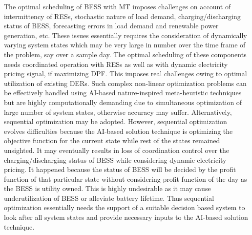 \documentclass[journal]{IEEEtran}
\begin{document}
\par The optimal scheduling of BESS with MT imposes challenges on account of intermittency of RESs, stochastic nature of load demand, charging/discharging status of BESS, forecasting errors in load demand and renewable power generation, etc. These issues essentially requires the consideration of dynamically varying system states which may be very large in number over the time frame of the problem, say over a sample day. The optimal scheduling of these components needs coordinated operation with RESs as well as with dynamic electricity pricing signal, if maximizing DPF. This imposes real challenges owing to optimal utilization of existing DERs. Such complex non-linear optimization problems can be effectively handled using AI-based nature-inspired meta-heuristic techniques but are highly computationally demanding due to simultaneous optimization of large number of system states, otherwise accuracy may suffer. Alternatively, sequential optimization may be adopted. However, sequential optimization evolves difficulties because the AI-based solution technique is optimizing the objective function for the current state while rest of the states remained unsighted. It may eventually results in loss of coordination control over the charging/discharging status of BESS while considering dynamic electricity pricing. It happened because the status of BESS will be decided by the profit function of that particular state without considering profit function of the day as the BESS is utility owned. This is highly undesirable as it may cause underutilization of BESS or alleviate battery lifetime. Thus sequential optimization essentially needs the support of a suitable decision based system to look after all system states and provide necessary inputs to the AI-based solution technique.
%	
%	
\end{document}
